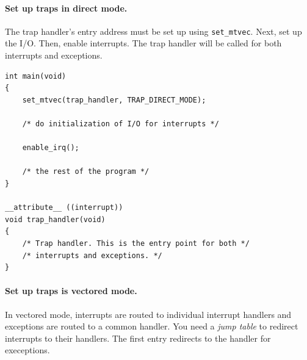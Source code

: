 \documentclass[12pt]{article}
\begin{document}
\paragraph*{Set up traps in direct mode.} The trap handler's entry address must be set up using \lstinline|set_mtvec|. Next, set up the I/O. Then, enable interrupts. The trap handler will be called for both interrupts and exceptions.

\begin{lstlisting}[]
int main(void)
{
    set_mtvec(trap_handler, TRAP_DIRECT_MODE);

    /* do initialization of I/O for interrupts */

    enable_irq();

    /* the rest of the program */
}

__attribute__ ((interrupt))
void trap_handler(void)
{
    /* Trap handler. This is the entry point for both */
    /* interrupts and exceptions. */
}
\end{lstlisting}

\paragraph*{Set up traps is vectored mode.} In vectored mode, interrupts are routed to individual interrupt handlers and exceptions are routed to a common handler. You need a \textsl{jump table} to redirect interrupts to their handlers. The first entry redirects to the handler for execeptions.
\end{document}
